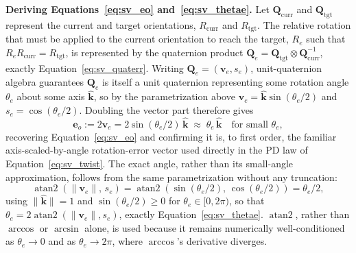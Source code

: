 \textbf{Deriving Equations~\eqref{eq:sv_eo} and~\eqref{eq:sv_thetae}.} Let $\mathbf{Q}_{\text{curr}}$
and $\mathbf{Q}_{\text{tgt}}$ represent the current and target orientations, $R_{\text{curr}}$ and
$R_{\text{tgt}}$. The relative rotation that must be applied to the current orientation to reach the
target, $R_e$ such that $R_e R_{\text{curr}} = R_{\text{tgt}}$, is represented by the quaternion
product $\mathbf{Q}_e = \mathbf{Q}_{\text{tgt}} \otimes \mathbf{Q}_{\text{curr}}^{-1}$, exactly
Equation~\eqref{eq:sv_quaterr}. Writing $\mathbf{Q}_e = (\mathbf{v}_e, s_e)$, unit-quaternion algebra
guarantees $\mathbf{Q}_e$ is itself a unit quaternion representing some rotation angle $\theta_e$
about some axis $\hat{\mathbf{k}}$, so by the parametrization above $\mathbf{v}_e = \hat{\mathbf{k}}
\sin(\theta_e/2)$ and $s_e = \cos(\theta_e/2)$. Doubling the vector part therefore gives
\begin{equation}
\mathbf{e}_o := 2\mathbf{v}_e = 2\sin(\theta_e/2)\,\hat{\mathbf{k}} \;\approx\; \theta_e\,\hat{\mathbf{k}}
\quad \text{for small } \theta_e,
\label{eq:appA_eoderiv}
\end{equation}
recovering Equation~\eqref{eq:sv_eo} and confirming it is, to first order, the familiar
axis-scaled-by-angle rotation-error vector used directly in the PD law of
Equation~\eqref{eq:sv_twist}. The exact angle, rather than its small-angle approximation, follows
from the same parametrization without any truncation:
\begin{equation}
\operatorname{atan2}\!\left( \lVert \mathbf{v}_e \rVert,\, s_e \right)
= \operatorname{atan2}\!\left( \sin(\theta_e/2),\, \cos(\theta_e/2) \right) = \theta_e/2,
\label{eq:appA_thetaederiv}
\end{equation}
using $\lVert \hat{\mathbf{k}} \rVert = 1$ and $\sin(\theta_e/2) \geq 0$ for $\theta_e \in [0, 2\pi)$,
so that $\theta_e = 2\operatorname{atan2}(\lVert\mathbf{v}_e\rVert, s_e)$, exactly
Equation~\eqref{eq:sv_thetae}. $\operatorname{atan2}$, rather than $\arccos$ or $\arcsin$ alone,
is used because it remains numerically well-conditioned as $\theta_e \to 0$ and as $\theta_e \to
2\pi$, where $\arccos$'s derivative diverges.

